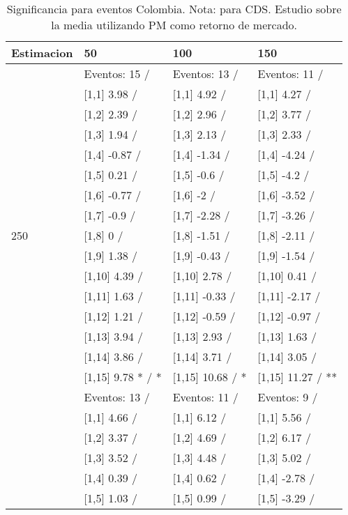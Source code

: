 \begin{table}

\caption{Significancia para eventos Colombia. Nota: para CDS. Estudio sobre la media utilizando PM como retorno de mercado.}
\centering
\begin{tabular}[t]{llll}
\toprule
Estimacion & 50 & 100 & 150\\
\midrule
 & Eventos:  15 / & Eventos:  13 / & Eventos:  11 /\\
 & {}[1,1] 3.98  / & {}[1,1] 4.92  / & {}[1,1] 4.27  /\\
 & {}[1,2] 2.39  / & {}[1,2] 2.96  / & {}[1,2] 3.77  /\\
 & {}[1,3] 1.94  / & {}[1,3] 2.13  / & {}[1,3] 2.33  /\\
 & {}[1,4] -0.87  / & {}[1,4] -1.34  / & {}[1,4] -4.24  /\\
\addlinespace
 & {}[1,5] 0.21  / & {}[1,5] -0.6  / & {}[1,5] -4.2  /\\
 & {}[1,6] -0.77  / & {}[1,6] -2  / & {}[1,6] -3.52  /\\
 & {}[1,7] -0.9  / & {}[1,7] -2.28  / & {}[1,7] -3.26  /\\
250 & {}[1,8] 0  / & {}[1,8] -1.51  / & {}[1,8] -2.11  /\\
 & {}[1,9] 1.38  / & {}[1,9] -0.43  / & {}[1,9] -1.54  /\\
\addlinespace
 & {}[1,10] 4.39  / & {}[1,10] 2.78  / & {}[1,10] 0.41  /\\
 & {}[1,11] 1.63  / & {}[1,11] -0.33  / & {}[1,11] -2.17  /\\
 & {}[1,12] 1.21  / & {}[1,12] -0.59  / & {}[1,12] -0.97  /\\
 & {}[1,13] 3.94  / & {}[1,13] 2.93  / & {}[1,13] 1.63  /\\
 & {}[1,14] 3.86  / & {}[1,14] 3.71  / & {}[1,14] 3.05  /\\
\addlinespace
 & {}[1,15] 9.78 * / * & {}[1,15] 10.68  / * & {}[1,15] 11.27  / **\\
 & Eventos:  13 / & Eventos:  11 / & Eventos:  9 /\\
 & {}[1,1] 4.66  / & {}[1,1] 6.12  / & {}[1,1] 5.56  /\\
 & {}[1,2] 3.37  / & {}[1,2] 4.69  / & {}[1,2] 6.17  /\\
 & {}[1,3] 3.52  / & {}[1,3] 4.48  / & {}[1,3] 5.02  /\\
\addlinespace
 & {}[1,4] 0.39  / & {}[1,4] 0.62  / & {}[1,4] -2.78  /\\
 & {}[1,5] 1.03  / & {}[1,5] 0.99  / & {}[1,5] -3.29  /\\

\end{tabular}
\end{table}

